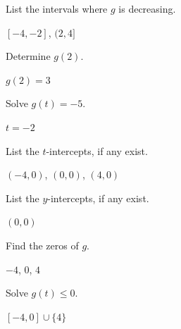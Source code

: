 \documentclass{ximera}
\begin{document}
\begin{question}
\begin{problem}
List the intervals where $g$ is decreasing.

\begin{solution}
$[-4, -2]$, $(2,4]$
\end{solution}

\end{problem}

\begin{problem}
Determine $g(2)$.
\begin{solution}
$g(2) = 3$

\end{solution}

\end{problem}

\begin{problem}
Solve $g(t) = -5$.

\begin{solution}
$t=-2$
\end{solution}

\end{problem}

\begin{problem}
List the $t$-intercepts, if any exist.
\begin{solution}
$(-4,0)$, $(0,0)$, $(4,0)$
\end{solution}

\end{problem}

\begin{problem}
List the $y$-intercepts, if any exist.

\begin{solution}
$(0,0)$

\end{solution}

\end{problem}

\begin{problem}
Find the zeros of $g$.
\begin{solution}
$-4$, $0$, $4$
\end{solution}

\end{problem}

\begin{problem}
Solve $g(t) \leq 0$.

\begin{solution}
$[-4,0] \cup \{4\}$
\end{solution}

\end{problem}


\end{question}
\end{document}

